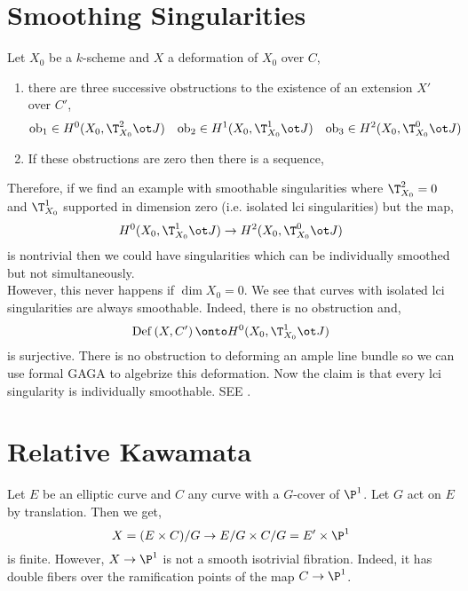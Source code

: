 \documentclass[12pt]{article}
\begin{document}
\section{Smoothing Singularities}

\begin{theorem}
Let $X_0$ be a $k$-scheme and $X$ a deformation of $X_0$ over $C$,
\begin{enumerate}
\item there are three successive obstructions to the existence of an extension $X'$ over $C'$,
\[ \ob_1 \in H^0(X_0, \T^2_{X_0} \ot J) \quad \ob_2 \in H^1(X_0, \T^1_{X_0} \ot J) \quad \ob_3 \in H^2(X_0, \T^0_{X_0} \ot J) \]

\item If these obstructions are zero then there is a sequence,
\begin{center}
\end{center}
\end{enumerate}
\end{theorem}

\begin{rmk}
Therefore, if we find an example with smoothable singularities where $\T^2_{X_0} = 0$ and $\T^1_{X_0}$ supported in dimension zero (i.e. isolated lci singularities) but the map,
\[ H^0(X_0, \T^1_{X_0} \ot J) \to H^2(X_0, \T^0_{X_0} \ot J) \]
is nontrivial then we could have singularities which can be individually smoothed but not simultaneously. 
\bigskip\\
However, this never happens if $\dim{X_0} = 0$. We see that curves with isolated lci singularities are always smoothable. Indeed, there is no obstruction and,
\[ \Def{X, C'} \onto H^0(X_0, \T^1_{X_0} \ot J) \]
is surjective. There is no obstruction to deforming an ample line bundle so we can use formal GAGA to algebrize this deformation. Now the claim is that every lci singularity is individually smoothable. SEE .
\end{rmk}

\section{Relative Kawamata}

\begin{example}
Let $E$ be an elliptic curve and $C$ any curve with a $G$-cover of $\P^1$. Let $G$ act on $E$ by translation. Then we get,
\[ X = (E \times C) / G \to E/G \times C/G = E' \times \P^1 \]
is finite. However, $X \to \P^1$ is not a smooth isotrivial fibration. Indeed, it has double fibers over the ramification points of the map $C \to \P^1$. 
\end{example}
\end{document}
